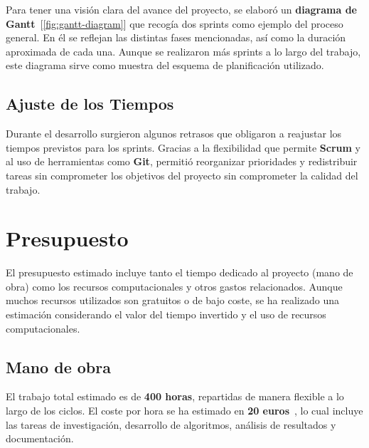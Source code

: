 Para tener una visión clara del avance del proyecto, se elaboró un \textbf{diagrama de Gantt}~[\ref{fig:gantt-diagram}]
que recogía dos sprints como ejemplo del proceso general.
En él se reflejan las distintas fases mencionadas, así como la duración aproximada de cada una.
Aunque se realizaron más sprints a lo largo del trabajo, este diagrama sirve como muestra del esquema de planificación
utilizado.

\subsection{Ajuste de los Tiempos}\label{subsec:ajuste-de-los-tiempos}
Durante el desarrollo surgieron algunos retrasos que obligaron a reajustar los tiempos previstos para los sprints.
Gracias a la flexibilidad que permite \textbf{Scrum} y al uso de herramientas como \textbf{Git},
permitió reorganizar prioridades y redistribuir tareas sin comprometer los objetivos del proyecto sin comprometer la calidad del trabajo.

\section{Presupuesto}\label{sec:presupuesto}
El presupuesto estimado incluye tanto el tiempo dedicado al proyecto (mano de obra) como los recursos computacionales y
otros gastos relacionados.
Aunque muchos recursos utilizados son gratuitos o de bajo coste, se ha realizado una estimación considerando el valor
del tiempo invertido y el uso de recursos computacionales.

\subsection{Mano de obra}\label{subsec:mano-de-obra}
El trabajo total estimado es de \textbf{400 horas}, repartidas de manera flexible a lo largo de los ciclos.
El coste por hora se ha estimado en \textbf{20 euros}~\cite{SalarioParaData}, lo cual incluye las tareas de
investigación, desarrollo de algoritmos, análisis de resultados y documentación.

